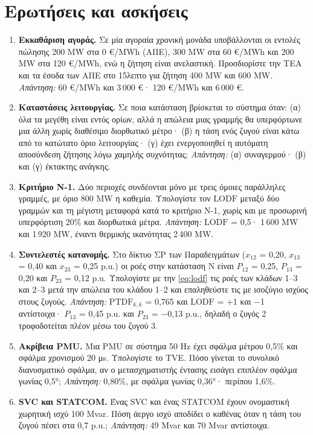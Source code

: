 \section{Ερωτήσεις και ασκήσεις}

\begin{enumerate}
\item \textbf{Εκκαθάριση αγοράς.} Σε μία αγοραία χρονική μονάδα υποβάλλονται οι εντολές
      πώλησης 200 MW στα 0 €/MWh (ΑΠΕ), 300 MW στα 60 €/MWh και 200 MW στα 120 €/MWh, ενώ η
      ζήτηση είναι ανελαστική. Προσδιορίστε την ΤΕΑ και τα έσοδα των ΑΠΕ στο 15λεπτο για
      ζήτηση 400 MW και 600 MW. \emph{Απάντηση:} 60 €/MWh και 3\,000 €· 120 €/MWh και
      6\,000 €.
\item \textbf{Καταστάσεις λειτουργίας.} Σε ποια κατάσταση βρίσκεται το σύστημα όταν:
      (α) όλα τα μεγέθη είναι εντός ορίων, αλλά η απώλεια μιας γραμμής θα υπερφόρτωνε μια
      άλλη χωρίς διαθέσιμο διορθωτικό μέτρο· (β) η τάση ενός ζυγού είναι κάτω από το κατώτατο
      όριο λειτουργίας· (γ) έχει ενεργοποιηθεί η αυτόματη αποσύνδεση ζήτησης λόγω χαμηλής
      συχνότητας; \emph{Απάντηση:} (α) συναγερμού· (β) και (γ) έκτακτης ανάγκης.
\item \textbf{Κριτήριο N-1.} Δύο περιοχές συνδέονται μόνο με τρεις όμοιες παράλληλες γραμμές,
      με όριο 800 MW η καθεμία. Υπολογίστε τον $\mathrm{LODF}$ μεταξύ δύο γραμμών και τη
      μέγιστη μεταφορά κατά το κριτήριο N-1, χωρίς και με προσωρινή υπερφόρτιση 20\% και
      διορθωτικά μέτρα. \emph{Απάντηση:} $\mathrm{LODF}$ = 0,5· 1\,600 MW και 1\,920 MW,
      έναντι θερμικής ικανότητας 2\,400 MW.
\item \textbf{Συντελεστές κατανομής.} Στο δίκτυο ΣΡ των Παραδειγμάτων ($x_{12}$ = 0,20,
      $x_{13}$ = 0,40 και $x_{23}$ = 0,25 p.u.) οι ροές στην κατάσταση N είναι
      $P_{12}$ = 0,25, $P_{13}$ = 0,20 και $P_{23}$ = 0,12 p.u. Υπολογίστε με την
      \eqref{eq:lodf} τις ροές των κλάδων 1--3 και 2--3 μετά την απώλεια του κλάδου 1--2 και
      επαληθεύστε τις με ισοζύγιο ισχύος στους ζυγούς. \emph{Απάντηση:}
      $\mathrm{PTDF}_{k,k}$ = 0,765 και $\mathrm{LODF}$ = +1 και −1 αντίστοιχα·
      $P_{13}$ = 0,45 p.u. και $P_{23}$ = −0,13 p.u., δηλαδή ο ζυγός 2 τροφοδοτείται πλέον
      μέσω του ζυγού 3.
\item \textbf{Ακρίβεια PMU.} Μια PMU σε σύστημα 50 Hz έχει σφάλμα μέτρου 0,5\% και σφάλμα
      χρονισμού 20 μs. Υπολογίστε το TVE. Πόσο γίνεται το συνολικό διανυσματικό σφάλμα, αν ο
      μετασχηματιστής έντασης εισάγει επιπλέον σφάλμα γωνίας 0,5°; \emph{Απάντηση:} 0,80\%,
      με σφάλμα γωνίας 0,36°· περίπου 1,6\%.
\item \textbf{SVC και STATCOM.} Ένας SVC και ένας STATCOM έχουν ονομαστική χωρητική ισχύ
      100 Mvar. Πόση άεργο ισχύ αποδίδει ο καθένας όταν η τάση του ζυγού πέσει στα 0,7 p.u.;
      \emph{Απάντηση:} 49 Mvar και 70 Mvar αντίστοιχα.
\end{enumerate}
